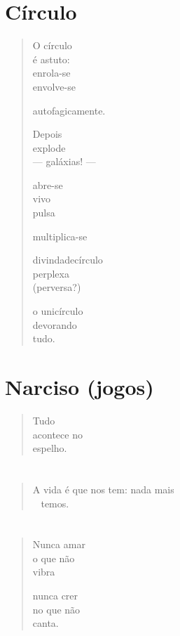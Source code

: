 \chapter{Círculo}

\begin{verse}
O círculo\\
é astuto:\\
enrola-se\\
envolve-se

autofagicamente.

Depois\\
explode\\
--- galáxias! ---

abre-se\\
vivo\\
pulsa

multiplica-se

divindadecírculo\\
perplexa\\
(perversa?)

o unicírculo\\
devorando\\
tudo.
\end{verse}

\chapter{Narciso (jogos)}

\begin{verse}
Tudo\\
acontece no\\
espelho.
\end{verse}

\chapter*{}
\begin{verse}
A vida é que nos tem: nada mais\\
\qquad\qquad\qquad\qquad\qquad\mbox{ } temos.
\end{verse}

\chapter*{}
\begin{verse}
Nunca amar\\
o que não\\
vibra

nunca crer\\
no que não\\
canta.
\end{verse}

